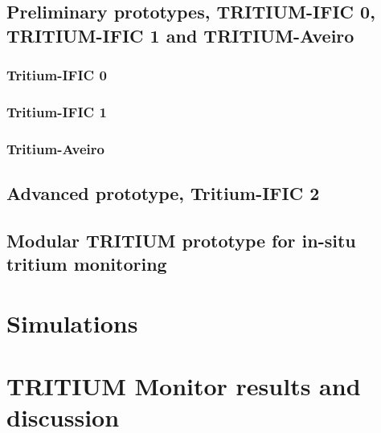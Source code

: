 \documentclass[12pt,a4paper]{book}
\begin{document}
	\section[Preliminary prototypes]{Preliminary prototypes, TRITIUM-IFIC 0, TRITIUM-IFIC 1 and TRITIUM-Aveiro}\label{sec:Preliminary_prototypes}
		\subsection{Tritium-IFIC 0}\label{subsec:TritiumIFIC0}
		
		
		\subsection{Tritium-IFIC 1}\label{subsec:TritiumIFIC1}
		
		
		\subsection{Tritium-Aveiro}\label{subsec:TritiumAveiro}
		
		\newpage
		
	\section[Tritium-IFIC 2]{Advanced prototype, Tritium-IFIC 2}\label{sec:TritiumIFIC2}
	
	\newpage
		
	\section[Modular TRITIUM prototype]{Modular TRITIUM prototype for in-situ tritium monitoring}\label{sec:TritiumMonitor}
	
	\newpage

\chapter{Simulations}  \label{chap:Simulations}
\newpage
	
\chapter[Results and discussion]{TRITIUM Monitor results and discussion}\label{chap:Results}\label{sec:ResultsPrototypes}
\end{document}

